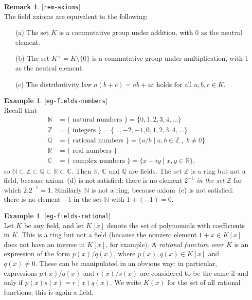 \documentclass{amsart}
\newcommand{\lbl}[1]{\label{#1}\textup{[\texttt{#1}]}\ \\}
\newcommand{\lbl}{\label}
\newcommand{\N}         {{\mathbb{N}}}
\newcommand{\Z}         {{\mathbb{Z}}}
\newcommand{\Q}         {{\mathbb{Q}}}
\newcommand{\R}         {{\mathbb{R}}}
\newcommand{\C}         {{\mathbb{C}}}
\newcommand{\sm}        {\setminus}
\newcommand{\st}        {\;|\;}
\newcommand{\tm}        {\times}
\renewcommand{\:}{\colon}
\theoremstyle{definition}
\newtheorem{remark}[theorem]{Remark}
\newtheorem{example}[theorem]{Example}
\begin{document}
\begin{remark}\lbl{rem-axioms}
 The field axioms are equivalent to the following:
 \begin{itemize}
  \item[(a)] The set $K$ is a commutative group under addition, with
   $0$ as the neutral element.
  \item[(b)] The set $K^\tm=K\sm\{0\}$ is a commutative group under
   multiplication, with $1$ as the neutral element.
  \item[(c)] The distributivity law $a(b+c)=ab+ac$ holds for all
   $a,b,c\in K$.
 \end{itemize}
\end{remark}

\begin{example}\lbl{eg-fields-numbers}
 Recall that 
 \begin{align*}
  \N &= \{ \text{ natural numbers } \} =
        \{ 0,1,2,3,4,\dotsc \} \\
  \Z &= \{ \text{ integers } \} =
        \{ \dotsc,-2,-1,0,1,2,3,4,\dotsc \} \\
  \Q &= \{ \text{ rational numbers } \} =
        \{ a/b\st a,b\in\Z\;,\; b\neq 0\} \\
  \R &= \{ \text{ real numbers } \} \\
  \C &= \{ \text{ complex numbers } \} = 
        \{ x+iy\st x,y\in\R \},
 \end{align*}
 so $\N\subset\Z\subset\Q\subset\R\subset\C$.  Then $\R$, $\C$ and
 $\Q$ are fields.  The set $\Z$ is a ring but not a field, because
 axiom~(d) is not satisfied: there is no element $2^{-1}$ \emph{in the
  set $\Z$} for which $2.2^{-1}=1$.  Similarly $\N$ is not a ring,
 because axiom~(c) is not satisfied: there is no element $-1$ in the
 set $\N$ with $1+(-1)=0$.
\end{example}

\begin{example}\lbl{eg-fields-rational}
 Let $K$ be any field, and let $K[x]$ denote the set of polynomials
 with coefficients in $K$.  This is a ring but not a field (because
 the nonzero element $1+x\in K[x]$ does not have an inverse in $K[x]$,
 for example).  A \emph{rational function over $K$} is an expression
 of the form $p(x)/q(x)$, where $p(x),q(x)\in K[x]$ and $q(x)\neq 0$.
 These can be manipulated in an obvious way: in particular,
 expressions $p(x)/q(x)$ and $r(x)/s(x)$ are considered to be the same
 if and only if $p(x)s(x)=r(x)q(x)$.  We write $K(x)$ for the set of
 all rational functions; this is again a field.
\end{example}
\end{document}
